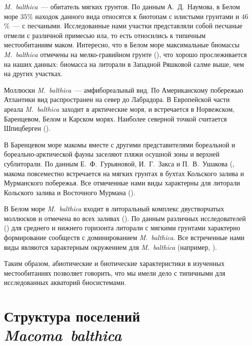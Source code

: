 \textit{M.~balthica}~--- обитатель мягких грунтов.
По данным А.~Д.~Наумова, в Белом море $35$\% находок данного вида относятся к биотопам с илистыми грунтами и $46$\%~--- с песчаными. 
Исследованные нами участки представляли собой песчаные отмели с различной примесью ила, то есть относились к типичным местообитаниям маком.
Интересно, что в Белом море максимальные биомассы \textit{M.~balthica} отмечены на мелко-гравийном грунте (\cite{Naumov_2006}), что хорошо прослеживается на наших данных: биомасса на литорали в Западной Ряшковой салме выше, чем на других участках.

Моллюски {\it M.~balthica}~--- амфибореальный вид. 
По Американскому побережью Атлантики вид распространен на север до Лабрадора.
В Европейской части ареала {\it M.~balthica} заходит в арктические моря, и встречается в Норвежском, Баренцевом, Белом и Карском морях.
Наиболее северной точкой считается Шпицберген (\cite{Zacepin_Filatova_1968}).

В Баренцевом море макомы вместе с другими представителями бореальной и бореально-арктической фауны заселяют пляжи осушной зоны и верхней сублиторали. 
По данным Е.~Ф.~Гурьяновой, И.~Г.~Закса и П.~В.~Ушакова (\cite{Guryanova_et_al_1928, Guryanova_Ushakov_1929, Guryanova_et_al_1930}, макома повсеместно встречается на мягких грунтах в бухтах Кольского залива и Мурманского побережья. 
Все отмеченные нами виды характерны для литорали Кольского залива и Восточного Мурмана (\cite{Derugin_1915, Guryanova_Ushakov_1929}).

В Белом море \textit{M.~balthica} входит в литоральный комплекс двустворчатых моллюсков и отмечена во всех заливах (\cite{Naumov_2006}).
По данным различных исследователей (\cite{Babkov_Golikov_1984, Naumov_Fedyakov_1993}) для среднего и нижнего горизонта литорали с мягкими грунтами характерно формирование сообществ с доминированием \textit{M.~balthica}. 
Все встреченные нами виды являются характерным окружением для \textit{M.~balthica} (например, \cite{Chertoprud_et_al_2004, Naumov_2006, Gerasimova_et_al_2010, Derevenschikov_Kravets_2010, Stolyarov_2010}).

\bigskip
Таким образом, абиотические и биотические характеристики в изученных местообитаниях позволяет говорить, что  мы имели дело с типичными для исследованных акваторий биосистемами. 


\afterpage{\clearpage}

\section{Структура поселений \textit{Macoma~balthica} }
